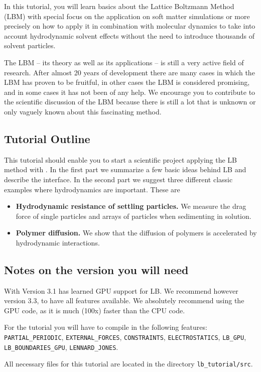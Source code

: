 In this tutorial, you will learn basics about the 
Lattice Boltzmann Method (LBM) with special focus on the application
on soft matter simulations or more precisely on how to apply it 
in combination with molecular dynamics to take into account 
hydrodynamic solvent effects without the need to introduce
thousands of solvent particles. 

The LBM -- its theory as well as its applications -- is 
still a very active field of research. After almost 20 years
of development there are many cases in which the LBM has proven
to be fruitful, in other cases the LBM is considered promising,
and in some cases it has not been of any help. We
encourage you to contribute to the scientific discussion 
of the LBM because there is still a lot 
that is unknown or only vaguely known about this fascinating
method. 

\subsection*{Tutorial Outline}
This tutorial should enable you to start a scientific project applying
the LB method with \ES{}. In the first part we summarize a few basic ideas behind LB 
and describe the interface. In the second part we suggest three
different classic examples where hydrodynamics are important. These are
\begin{itemize}
  \item {\bf Hydrodynamic resistance of settling particles.} We measure the drag
   force of single particles and arrays of particles when sedimenting
   in solution.
  \item {\bf Polymer diffusion.} We show that the diffusion of polymers is accelerated 
    by hydrodynamic interactions. 
\end{itemize}

\subsection*{Notes on the \ES{} version you will need}
With Version 3.1 \ES{} has learned GPU support for LB. We recommend however
version 3.3, to have all features available. We absolutely recommend using 
the GPU code, as it is much (100x) faster than the CPU code.

For the tutorial you will have to compile in the following  features:
{\tt PARTIAL\_PERIODIC}, {\tt EXTERNAL\_FORCES}, {\tt CONSTRAINTS}, {\tt ELECTROSTATICS}, 
{\tt LB\_GPU}, {\tt LB\_BOUNDARIES\_GPU},  {\tt LENNARD\_JONES}.

All necessary files for this tutorial are located in the directory {\tt lb\_tutorial/src}.
\pagebreak


